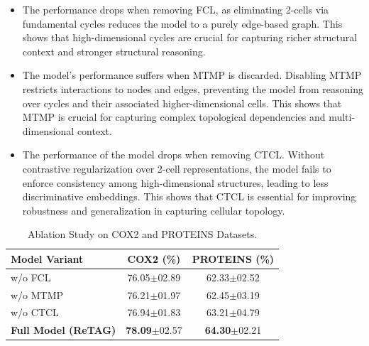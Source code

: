 \begin{itemize}
   \item The performance drops when removing FCL, as eliminating 2-cells via fundamental cycles reduces the model to a purely edge-based graph. This shows that high-dimensional cycles are crucial for capturing richer structural context and stronger structural reasoning.
    \item The model’s performance suffers when MTMP is discarded. Disabling MTMP restricts interactions to nodes and edges, preventing the model from reasoning over cycles and their associated higher-dimensional cells. This shows that MTMP is crucial for capturing complex topological dependencies and multi-dimensional context. %
    \item The performance of the model drops when removing CTCL. Without contrastive regularization over 2-cell representations, the model fails to enforce consistency among high-dimensional structures, leading to less discriminative embeddings. This shows that CTCL is essential for improving robustness and generalization in capturing cellular topology.

\end{itemize}
\begin{table}[t]
\centering
\caption{Ablation Study on COX2 and PROTEINS Datasets.}
\label{tab:ablation}

\footnotesize
\setlength{\tabcolsep}{4pt}
\renewcommand{\arraystretch}{0.92}

\begin{tabular}{lcc}
\toprule
\textbf{Model Variant} & \textbf{COX2 (\%)} & \textbf{PROTEINS (\%)} \\
\midrule
w/o FCL   & 76.05$\pm$02.89 & 62.33$\pm$02.52 \\
w/o MTMP  & 76.21$\pm$01.97 & 62.45$\pm$03.19 \\
w/o CTCL  & 76.94$\pm$01.83 & 63.21$\pm$04.79 \\

\midrule
\textbf{Full Model (ReTAG)} 
          & \textbf{78.09}$\pm$02.57 
          & \textbf{64.30}$\pm$02.21 \\
\bottomrule
\end{tabular}
\end{table}




